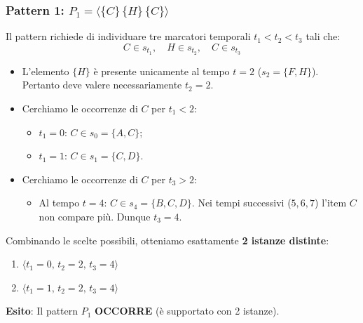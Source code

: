 \subsubsection{Pattern 1: $P_1 = \langle \{C\} \, \{H\} \, \{C\} \rangle$}
Il pattern richiede di individuare tre marcatori temporali $t_1 < t_2 < t_3$ tali che:
\begin{equation*}
C \in s_{t_1}, \quad H \in s_{t_2}, \quad C \in s_{t_3}
\end{equation*}
\begin{itemize}
    \item L'elemento $\{H\}$ è presente unicamente al tempo $t = 2$ ($s_2 = \{F, H\}$). Pertanto deve valere necessariamente $t_2 = 2$.
    \item Cerchiamo le occorrenze di $C$ per $t_1 < 2$:
    \begin{itemize}[noitemsep]
        \item $t_1 = 0$: $C \in s_0 = \{A, C\}$;
        \item $t_1 = 1$: $C \in s_1 = \{C, D\}$.
    \end{itemize}
    \item Cerchiamo le occorrenze di $C$ per $t_3 > 2$:
    \begin{itemize}[noitemsep]
        \item Al tempo $t = 4$: $C \in s_4 = \{B, C, D\}$. Nei tempi successivi ($5, 6, 7$) l'item $C$ non compare più. Dunque $t_3 = 4$.
    \end{itemize}
\end{itemize}
Combinando le scelte possibili, otteniamo esattamente \textbf{2 istanze distinte}:
\begin{enumerate}
    \item $\langle t_1 = 0, \, t_2 = 2, \, t_3 = 4 \rangle$
    \item $\langle t_1 = 1, \, t_2 = 2, \, t_3 = 4 \rangle$
\end{enumerate}
\textbf{Esito}: Il pattern $P_1$ \textbf{OCCORRE} (è supportato con 2 istanze).

